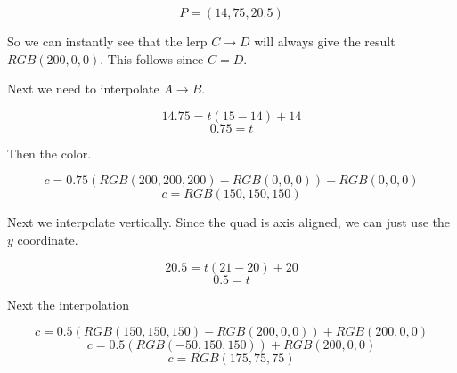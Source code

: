 \documentclass{article}
\begin{document}
\begin{enumerate}
            \begin{displaymath}
                P = (14,75, 20.5)
            \end{displaymath}

            \begin{mdframed}
                So we can instantly see that the lerp
                $C \to D$ will always give the result
                $RGB(200, 0, 0)$. This follows since
                $C = D$.

                Next we need to interpolate $A \to B$.

                \begin{displaymath}
                    14.75 = t(15 - 14) + 14
                \end{displaymath}
                \begin{displaymath}
                    0.75 = t
                \end{displaymath}

                Then the color.

                \begin{displaymath}
                    c = 0.75(RGB(200,200,200) - RGB(0,0,0)) + 
                    RGB(0,0,0)
                \end{displaymath}
                \begin{displaymath}
                    c = RGB(150, 150, 150)
                \end{displaymath}

                Next we interpolate vertically. Since the quad
                is axis aligned, we can just use the $y$ coordinate.

                \begin{displaymath}
                    20.5 = t(21 - 20) + 20
                \end{displaymath}
                \begin{displaymath}
                    0.5 = t
                \end{displaymath}

                Next the interpolation

                \begin{displaymath}
                    c = 0.5(RGB(150, 150, 150) - RGB(200, 0, 0)) + RGB(200, 0, 0)
                \end{displaymath}
                \begin{displaymath}
                    c = 0.5(RGB(-50, 150, 150)) + RGB(200, 0, 0)
                \end{displaymath}
                \begin{displaymath}
                    c = RGB(175, 75, 75)
                \end{displaymath}
            \end{mdframed}


\end{enumerate}
\end{document}
